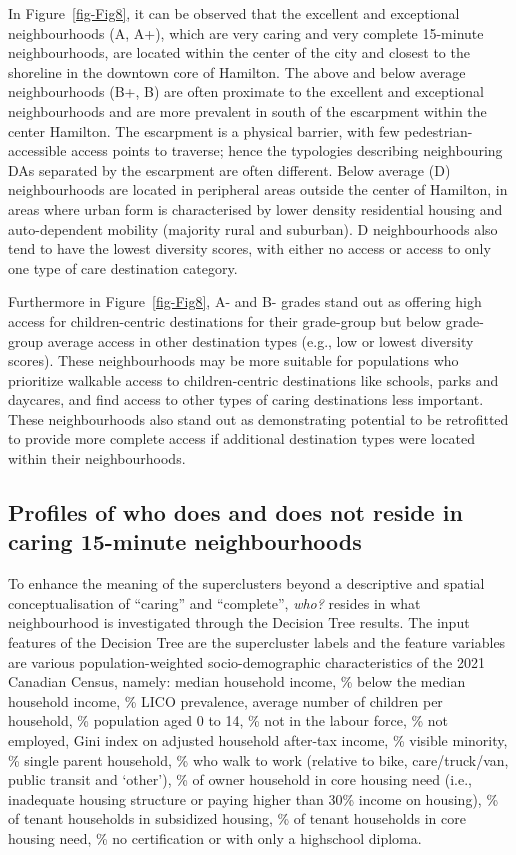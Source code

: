 \documentclass[
  authoryear,
  preprint,
  3p]{elsarticle}
\begin{document}
In Figure~\ref{fig-Fig8}, it can be observed that the excellent and
exceptional neighbourhoods (A, A+), which are very caring and very
complete 15-minute neighbourhoods, are located within the center of the
city and closest to the shoreline in the downtown core of Hamilton. The
above and below average neighbourhoods (B+, B) are often proximate to
the excellent and exceptional neighbourhoods and are more prevalent in
south of the escarpment within the center Hamilton. The escarpment is a
physical barrier, with few pedestrian-accessible access points to
traverse; hence the typologies describing neighbouring DAs separated by
the escarpment are often different. Below average (D) neighbourhoods are
located in peripheral areas outside the center of Hamilton, in areas
where urban form is characterised by lower density residential housing
and auto-dependent mobility (majority rural and suburban). D
neighbourhoods also tend to have the lowest diversity scores, with
either no access or access to only one type of care destination
category.

Furthermore in Figure~\ref{fig-Fig8}, A- and B- grades stand out as
offering high access for children-centric destinations for their
grade-group but below grade-group average access in other destination
types (e.g., low or lowest diversity scores). These neighbourhoods may
be more suitable for populations who prioritize walkable access to
children-centric destinations like schools, parks and daycares, and find
access to other types of caring destinations less important. These
neighbourhoods also stand out as demonstrating potential to be
retrofitted to provide more complete access if additional destination
types were located within their neighbourhoods.

\subsection{Profiles of who does and does not reside in caring 15-minute
neighbourhoods}\label{profiles-of-who-does-and-does-not-reside-in-caring-15-minute-neighbourhoods}

To enhance the meaning of the superclusters beyond a descriptive and
spatial conceptualisation of ``caring'' and ``complete'', \emph{who?}
resides in what neighbourhood is investigated through the Decision Tree
results. The input features of the Decision Tree are the supercluster
labels and the feature variables are various population-weighted
socio-demographic characteristics of the 2021 Canadian Census, namely:
median household income, \% below the median household income, \% LICO
prevalence, average number of children per household, \% population aged
0 to 14, \% not in the labour force, \% not employed, Gini index on
adjusted household after-tax income, \% visible minority, \% single
parent household, \% who walk to work (relative to bike, care/truck/van,
public transit and `other'), \% of owner household in core housing need
(i.e., inadequate housing structure or paying higher than 30\% income on
housing), \% of tenant households in subsidized housing, \% of tenant
households in core housing need, \% no certification or with only a
highschool diploma.
\end{document}
